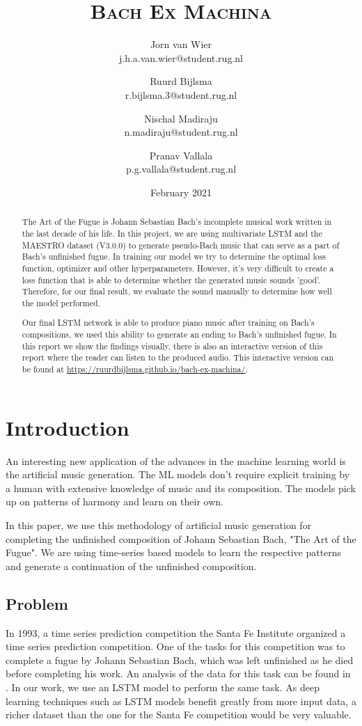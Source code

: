 \documentclass[11pt, twocolumn]{article}
\title{\vspace{1.5cm}\textbf{\scshape{Bach Ex Machina}}}
\author{
    Jorn van Wier\\
    \small j.h.a.van.wier@student.rug.nl
    
    \and 
    
    Ruurd Bijlsma\\
    \small r.bijlsma.3@student.rug.nl
    
    \and 
    
    Nischal Madiraju\\
    \small n.madiraju@student.rug.nl
    
    \and 
    
    Pranav Vallala\\
    \small p.g.vallala@student.rug.nl
}
\date{February 2021}
\begin{document}

\maketitle

\thispagestyle{firstpage}

\begin{abstract}
\noindent
The Art of the Fugue is Johann Sebastian Bach's incomplete musical work written in the last decade of his life. In this project, we are using multivariate LSTM and the MAESTRO dataset (V3.0.0) to generate pseudo-Bach music that can serve as a part of Bach's unfinished fugue. 
In training our model we try to determine the optimal loss function, optimizer and other hyperparameters. However, it's very difficult to create a loss function that is able to determine whether the generated music sounds 'good'. Therefore, for our final result, we evaluate the sound manually to determine how well the model performed.

Our final LSTM network is able to produce piano music after training on Bach's compositions, we used this ability to generate an ending to Bach's unfinished fugue. \ifpdf
In this report we show the findings visually, there is also an interactive version of this report where the reader can listen to the produced audio. This interactive version can be found at \url{https://ruurdbijlsma.github.io/bach-ex-machina/}.
\fi

\end{abstract}
\section{Introduction}
An interesting new application of the advances in the machine learning world is the artificial music generation. The ML models don't require explicit training by a human with extensive knowledge of music and its composition. The models pick up on patterns of harmony and learn on their own. 

In this paper, we use this methodology of artificial music generation for completing the unfinished composition of Johann Sebastian Bach, "The Art of the Fugue". We are using time-series based models to learn the respective patterns and generate a continuation of the unfinished composition. 
\subsection{Problem}
In 1993, a time series prediction competition the Santa Fe Institute organized a time series prediction competition. One of the tasks for this competition was to complete a fugue by Johann Sebastian Bach, which was left unfinished as he died before completing his work. 
An analysis of the data for this task can be found in \cite{dirstt1993baroque}. In our work, we use an LSTM model to perform the same task. As deep learning techniques such as LSTM models benefit greatly from more input data, a richer dataset than the one for the Santa Fe competition would be very valuable.
\end{document}
